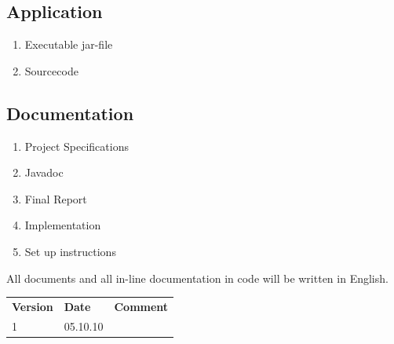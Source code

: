\documentclass[a4paper,10pt,titlepage]{article}
\begin{document}
\subsection{Application}
\begin{enumerate}
 \item Executable jar-file
 \item Sourcecode
\end{enumerate}

\subsection{Documentation}
\begin{enumerate}
 \item Project Specifications
 \item Javadoc
 \item Final Report
 \item Implementation
 \item Set up instructions
\end{enumerate}

All documents and all in-line documentation in code will be written in English.


\newpage
\begin{tabularx}{\textwidth}{XXX}
\textbf{Version} & \textbf{Date} & \textbf{Comment}\\
1 & 05.10.10 & \\
\end{tabularx}
\end{document}
